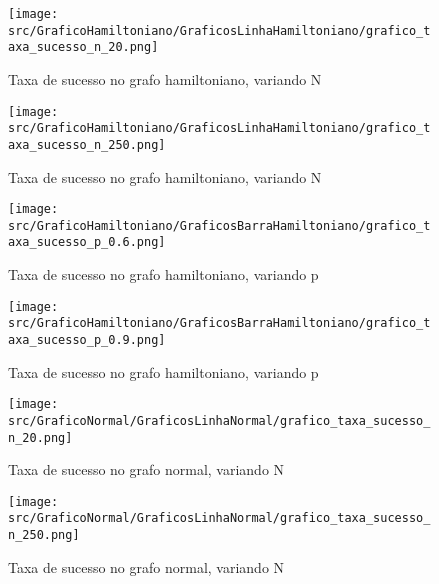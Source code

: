 \documentclass[12pt, openright, oneside, a4paper, chapter=TITLE, section=TITLE, subsection=TITLE, subsubsection=TITLE, brazil]{abntex2}
\begin{document}
\begin{figure}[h]
    \centering
    \begin{minipage}{0.45\textwidth}
        \centering
        \texttt{[image: src/GraficoHamiltoniano/GraficosLinhaHamiltoniano/grafico\_taxa\_sucesso\_n\_20.png]}
        \caption{Taxa de sucesso no grafo hamiltoniano, variando N}
        \label{fig:Taxa de sucesso no grafo hamiltoniano, variando N}
    \end{minipage}
    \hfill
    \begin{minipage}{0.45\textwidth}
        \centering
        \texttt{[image: src/GraficoHamiltoniano/GraficosLinhaHamiltoniano/grafico\_taxa\_sucesso\_n\_250.png]}
        \caption{Taxa de sucesso no grafo hamiltoniano, variando N}
        \label{fig:Taxa de sucesso no grafo hamiltoniano, variando N250}
        \end{minipage}
\end{figure}

\begin{figure}[h]
    \centering
    \begin{minipage}{0.45\textwidth}
        \centering
        \texttt{[image: src/GraficoHamiltoniano/GraficosBarraHamiltoniano/grafico\_taxa\_sucesso\_p\_0.6.png]}
        \caption{Taxa de sucesso no grafo hamiltoniano, variando p}
        \label{fig:Taxa de sucesso no grafo hamiltoniano, variando p}
    \end{minipage}
    \hfill
    \begin{minipage}{0.45\textwidth}
        \centering
        \texttt{[image: src/GraficoHamiltoniano/GraficosBarraHamiltoniano/grafico\_taxa\_sucesso\_p\_0.9.png]}
        \caption{Taxa de sucesso no grafo hamiltoniano, variando p}
        \label{fig:Taxa de sucesso no grafo hamiltoniano, variando p.9}
    \end{minipage}
\end{figure}

\begin{figure}[h]
    \centering
    \begin{minipage}{0.45\textwidth}
        \centering
        \texttt{[image: src/GraficoNormal/GraficosLinhaNormal/grafico\_taxa\_sucesso\_n\_20.png]}
        \caption{Taxa de sucesso no grafo normal, variando N}
        \label{fig:Taxa de sucesso no grafo normal, variando N}
    \end{minipage}
    \hfill
    \begin{minipage}{0.45\textwidth}
        \centering
        \texttt{[image: src/GraficoNormal/GraficosLinhaNormal/grafico\_taxa\_sucesso\_n\_250.png]}
        \caption{Taxa de sucesso no grafo normal, variando N}
        \label{fig:Taxa de sucesso no grafo normal, variando N250}
        \end{minipage}
\end{figure}
\end{document}
